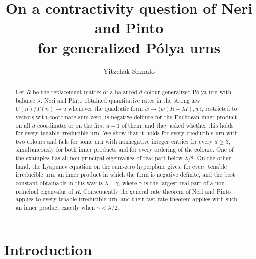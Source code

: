\documentclass[11pt]{amsart}
\title[A contractivity question for generalized P\'olya urns]{On a contractivity question of Neri and Pinto\\ for generalized P\'olya urns}
\author{Yitzchak Shmalo}
\theoremstyle{definition}
\theoremstyle{remark}
\begin{document}
\begin{abstract}
Let $R$ be the replacement matrix of a balanced $d$-colour generalized P\'olya urn with balance $\lambda$. Neri and Pinto obtained quantitative rates in the strong law $U(n)/T(n)\to u$ whenever the quadratic form $w\mapsto\langle w(R-\lambda I),w\rangle$, restricted to vectors with coordinate sum zero, is negative definite for the Euclidean inner product on all $d$ coordinates or on the first $d-1$ of them, and they asked whether this holds for every tenable irreducible urn. We show that it holds for every irreducible urn with two colours and fails for some urn with nonnegative integer entries for every $d\ge 3$, simultaneously for both inner products and for every ordering of the colours. One of the examples has all non-principal eigenvalues of real part below $\lambda/2$. On the other hand, the Lyapunov equation on the sum-zero hyperplane gives, for every tenable irreducible urn, an inner product in which the form is negative definite, and the best constant obtainable in this way is $\lambda-\gamma$, where $\gamma$ is the largest real part of a non-principal eigenvalue of $R$. Consequently the general rate theorem of Neri and Pinto applies to every tenable irreducible urn, and their fast-rate theorem applies with such an inner product exactly when $\gamma<\lambda/2$.
\end{abstract}

\maketitle

\section{Introduction}
\end{document}

